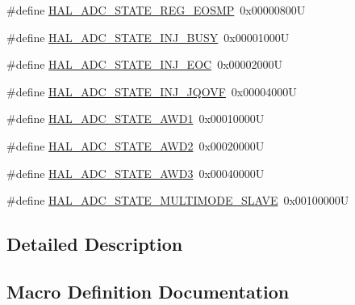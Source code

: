 \begin{DoxyCompactItemize}
\item 
\#define \hyperlink{group___a_d_c___exported___types_ga28309e91f810694b13b5035f4ff698ce}{H\+A\+L\+\_\+\+A\+D\+C\+\_\+\+S\+T\+A\+T\+E\+\_\+\+R\+E\+G\+\_\+\+E\+O\+S\+MP}~0x00000800U
\item 
\#define \hyperlink{group___a_d_c___exported___types_ga0044d240de80a70923b5c970d19ba24b}{H\+A\+L\+\_\+\+A\+D\+C\+\_\+\+S\+T\+A\+T\+E\+\_\+\+I\+N\+J\+\_\+\+B\+U\+SY}~0x00001000U
\item 
\#define \hyperlink{group___a_d_c___exported___types_gafcfffd11ab8b84d3b0a1ce50ccf821d5}{H\+A\+L\+\_\+\+A\+D\+C\+\_\+\+S\+T\+A\+T\+E\+\_\+\+I\+N\+J\+\_\+\+E\+OC}~0x00002000U
\item 
\#define \hyperlink{group___a_d_c___exported___types_ga0e29888675cbdd18e461fcd7711a2ad4}{H\+A\+L\+\_\+\+A\+D\+C\+\_\+\+S\+T\+A\+T\+E\+\_\+\+I\+N\+J\+\_\+\+J\+Q\+O\+VF}~0x00004000U
\item 
\#define \hyperlink{group___a_d_c___exported___types_ga39ce295171a5e608097017fda4cfd7d5}{H\+A\+L\+\_\+\+A\+D\+C\+\_\+\+S\+T\+A\+T\+E\+\_\+\+A\+W\+D1}~0x00010000U
\item 
\#define \hyperlink{group___a_d_c___exported___types_gae6e9712c706ca7f2998dfb5cf776b48f}{H\+A\+L\+\_\+\+A\+D\+C\+\_\+\+S\+T\+A\+T\+E\+\_\+\+A\+W\+D2}~0x00020000U
\item 
\#define \hyperlink{group___a_d_c___exported___types_gaa43e91fedb9ce41e36bc78ced4f3912e}{H\+A\+L\+\_\+\+A\+D\+C\+\_\+\+S\+T\+A\+T\+E\+\_\+\+A\+W\+D3}~0x00040000U
\item 
\#define \hyperlink{group___a_d_c___exported___types_ga24f867061abe6ee31227ec21289c69db}{H\+A\+L\+\_\+\+A\+D\+C\+\_\+\+S\+T\+A\+T\+E\+\_\+\+M\+U\+L\+T\+I\+M\+O\+D\+E\+\_\+\+S\+L\+A\+VE}~0x00100000U
\end{DoxyCompactItemize}


\subsection{Detailed Description}


\subsection{Macro Definition Documentation}
\mbox{\label{group___a_d_c___exported___types_ga39ce295171a5e608097017fda4cfd7d5}} 
